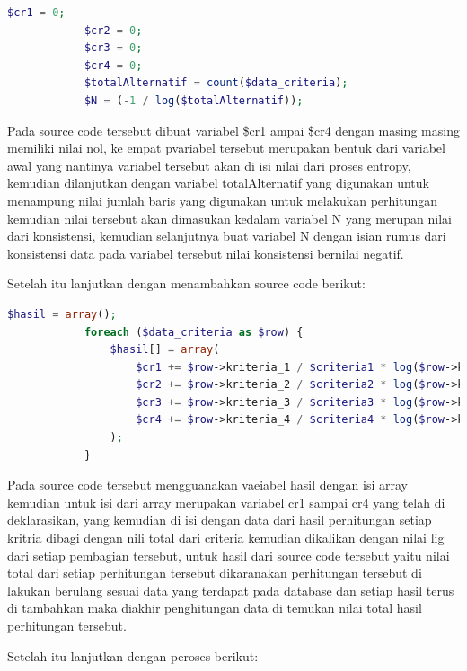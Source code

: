 \begin{lstlisting}[language=PHP]
	        $cr1 = 0;  
	        $cr2 = 0;  
	        $cr3 = 0;  
	        $cr4 = 0;  
	        $totalAlternatif = count($data_criteria);  
	        $N = (-1 / log($totalAlternatif));  
\end{lstlisting}

Pada source code tersebut dibuat variabel \$cr1 ampai \$cr4 dengan masing masing memiliki nilai nol, ke empat pvariabel tersebut merupakan bentuk dari variabel awal yang nantinya variabel tersebut akan di isi nilai dari proses entropy, kemudian dilanjutkan dengan variabel totalAlternatif yang digunakan untuk menampung nilai jumlah baris yang digunakan untuk melakukan perhitungan kemudian nilai tersebut akan dimasukan kedalam variabel N yang merupan nilai dari konsistensi, kemudian selanjutnya buat variabel N dengan isian rumus dari konsistensi data pada variabel tersebut nilai konsistensi bernilai negatif.\par
	Setelah itu lanjutkan dengan menambahkan source code berikut:\par

\begin{lstlisting}[language=PHP]
	$hasil = array();  
	        foreach ($data_criteria as $row) {  
	            $hasil[] = array(  
	                $cr1 += $row->kriteria_1 / $criteria1 * log($row->kriteria_1 / $criteria1),  
	                $cr2 += $row->kriteria_2 / $criteria2 * log($row->kriteria_2 / $criteria2),  
	                $cr3 += $row->kriteria_3 / $criteria3 * log($row->kriteria_3 / $criteria3),  
	                $cr4 += $row->kriteria_4 / $criteria4 * log($row->kriteria_4 / $criteria4),  
	            );  
	        }  
\end{lstlisting}

Pada source code tersebut mengguanakan vaeiabel hasil dengan isi array kemudian untuk isi dari array merupakan variabel cr1 sampai cr4 yang telah di deklarasikan, yang kemudian di isi dengan data dari hasil perhitungan setiap kritria dibagi dengan nili total dari criteria kemudian dikalikan dengan nilai lig dari setiap pembagian tersebut, untuk hasil dari source code tersebut yaitu nilai total dari setiap perhitungan tersebut dikaranakan perhitungan tersebut di lakukan berulang sesuai data yang terdapat pada database dan setiap hasil terus di tambahkan maka diakhir penghitungan data di temukan nilai total hasil perhitungan tersebut.\par
Setelah itu lanjutkan dengan peroses berikut:\par

